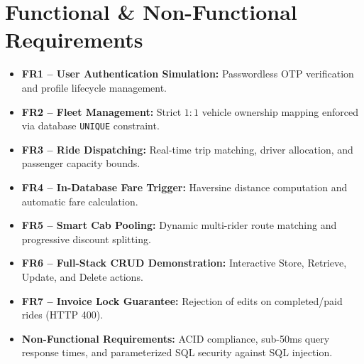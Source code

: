 \section{Functional \& Non-Functional Requirements}
\begin{itemize}[itemsep=1.5pt, topsep=2pt, parsep=0pt]
    \item \textbf{FR1 -- User Authentication Simulation:} Passwordless OTP verification and profile lifecycle management.
    \item \textbf{FR2 -- Fleet Management:} Strict $1:1$ vehicle ownership mapping enforced via database \texttt{UNIQUE} constraint.
    \item \textbf{FR3 -- Ride Dispatching:} Real-time trip matching, driver allocation, and passenger capacity bounds.
    \item \textbf{FR4 -- In-Database Fare Trigger:} Haversine distance computation and automatic fare calculation.
    \item \textbf{FR5 -- Smart Cab Pooling:} Dynamic multi-rider route matching and progressive discount splitting.
    \item \textbf{FR6 -- Full-Stack CRUD Demonstration:} Interactive Store, Retrieve, Update, and Delete actions.
    \item \textbf{FR7 -- Invoice Lock Guarantee:} Rejection of edits on completed/paid rides (HTTP 400).
    \item \textbf{Non-Functional Requirements:} ACID compliance, sub-50ms query response times, and parameterized SQL security against SQL injection.
\end{itemize}
